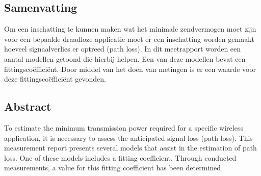 \subsection{Samenvatting}
Om een inschatting te kunnen maken wat het minimale zendvermogen moet zijn voor een bepaalde draadloze applicatie moet er een inschatting worden gemaakt hoeveel signaalverlies er optreed (path loss). In dit meetrapport worden een aantal modellen getoond die hierbij helpen. Een van deze modellen bevat een fittingscoëfficiënt. Door middel van het doen van metingen is er een waarde voor deze fittingscoëfficiënt gevonden.
\subsection{Abstract}
To estimate the minimum transmission power required for a specific wireless application, it is necessary to assess the anticipated signal loss (path loss). This measurement report presents several models that assist in the estimation of path loss. One of these models includes a fitting coefficient. Through conducted measurements, a value for this fitting coefficient has been determined
